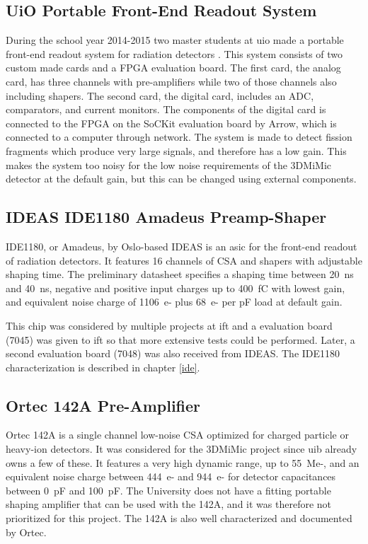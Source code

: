 \documentclass[../main/thesis.tex]{subfiles}
\begin{document}
\subsection{UiO Portable Front-End Readout System}
\label{e-uio}
During the school year 2014-2015 two master students at \gls{uio} made a portable front-end readout system for radiation detectors \citep{tali} \citep{oltedal}. This system consists of two custom made cards and a \gls{FPGA} evaluation board. The first card, the analog card, has three channels with pre-amplifiers while two of those channels also including shapers. The second card, the digital card, includes an \gls{ADC}, comparators, and current monitors. The components of the digital card is connected to the \gls{FPGA} on the SoCKit evaluation board by Arrow, which is connected to a computer through network. The system is made to detect fission fragments which produce very large signals, and therefore has a low gain. This makes the system too noisy for the low noise requirements of the 3DMiMic detector at the default gain, but this can be changed using external components.

\subsection{IDEAS IDE1180 Amadeus Preamp-Shaper}
\label{e-ide1180}
IDE1180, or Amadeus, by Oslo-based IDEAS is an \gls{asic} for the front-end readout of radiation detectors. It features 16 channels of \gls{CSA} and shapers with adjustable shaping time. The preliminary datasheet \citep{IDE1180} specifies a shaping time between 20~ns and 40~ns, negative and positive input charges up to 400~fC with lowest gain, and equivalent noise charge of 1106~e- plus 68~e- per pF load at default gain. 

This chip was considered by multiple projects at \gls{ift} and a evaluation board (7045) was given to \gls{ift} so that more extensive tests could be performed. Later, a second evaluation board (7048) was also received from IDEAS. The IDE1180 characterization is described in chapter \ref{ide}. 

\subsection{Ortec 142A Pre-Amplifier}
\label{e-ortec}
Ortec 142A is a single channel low-noise \gls{CSA} optimized for charged particle or heavy-ion detectors. It was considered for the 3DMiMic project since \gls{uib} already owns a few of these. It features a very high dynamic range, up to 55~Me-, and an equivalent noise charge between 444~e- and 944~e- for detector capacitances between 0~pF and 100~pF. The University does not have a fitting portable shaping amplifier that can be used with the 142A, and it was therefore not prioritized for this project. The 142A is also well characterized and documented by Ortec. \citep{Ortecdata}
\end{document}
